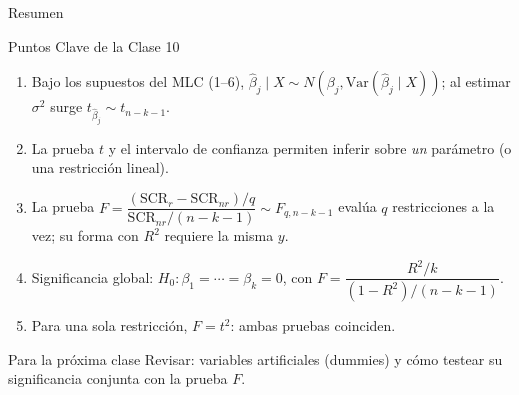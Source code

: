 \documentclass{beamer}
\begin{document}
\begin{frame}{Resumen}

\begin{block}{Puntos Clave de la Clase 10}
\begin{enumerate}
    \item Bajo los supuestos del MLC (1--6), $\hat{\beta}_j\mid X \sim N(\beta_j, \text{Var}(\hat{\beta}_j\mid X))$; al estimar $\sigma^2$ surge $t_{\hat{\beta}_j} \sim t_{n-k-1}$.
    \item La prueba $t$ y el intervalo de confianza permiten inferir sobre \emph{un} parámetro (o una restricción lineal).
    \item La prueba $F = \dfrac{(\text{SCR}_r-\text{SCR}_{nr})/q}{\text{SCR}_{nr}/(n-k-1)} \sim F_{q,n-k-1}$ evalúa $q$ restricciones a la vez; su forma con $R^2$ requiere la misma $y$.
    \item Significancia global: $H_0:\beta_1=\cdots=\beta_k=0$, con $F = \dfrac{R^2/k}{(1-R^2)/(n-k-1)}$.
    \item Para una sola restricción, $F = t^2$: ambas pruebas coinciden.
\end{enumerate}
\end{block}

\begin{alertblock}{Para la próxima clase}
Revisar: variables artificiales (dummies) y cómo testear su significancia conjunta con la prueba $F$.
\end{alertblock}

\end{frame}
\end{document}
